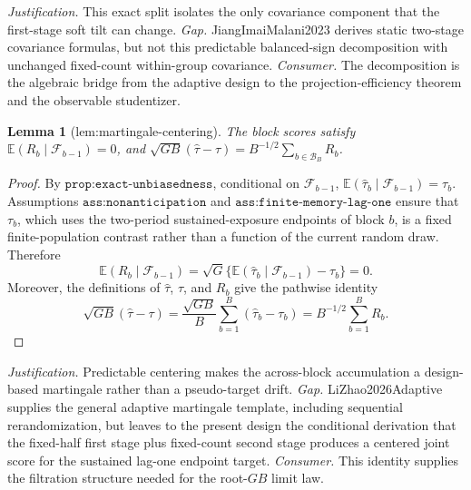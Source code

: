 \documentclass{article}
\newtheorem{lemma}{Lemma}
\begin{document}
\par\smallskip\noindent \textit{Justification.} This exact split isolates the only covariance component that the first-stage soft tilt can change. \textit{Gap.} JiangImaiMalani2023 derives static two-stage covariance formulas, but not this predictable balanced-sign decomposition with unchanged fixed-count within-group covariance. \textit{Consumer.} The decomposition is the algebraic bridge from the adaptive design to the projection-efficiency theorem and the observable studentizer.

\begin{lemma}[lem:martingale-centering]\label{lem:martingale-centering}
The block scores satisfy \(\mathbb E(R_b\mid\mathcal F_{b-1})=0\), and \(\sqrt{GB}(\widehat\tau-\tau)=B^{-1/2}\sum_{b\in\mathcal B_B}R_b\).
\end{lemma}
\begin{proof}
By \(\texttt{prop:exact-unbiasedness}\), conditional on \(\mathcal F_{b-1}\), \(\mathbb E(\widehat\tau_b\mid\mathcal F_{b-1})=\tau_b\).  Assumptions \(\texttt{ass:nonanticipation}\) and \(\texttt{ass:finite-memory-lag-one}\) ensure that \(\tau_b\), which uses the two-period sustained-exposure endpoints of block \(b\), is a fixed finite-population contrast rather than a function of the current random draw.  Therefore
\[
 \mathbb E(R_b\mid\mathcal F_{b-1})
 =\sqrt G\{\mathbb E(\widehat\tau_b\mid\mathcal F_{b-1})-\tau_b\}=0.
\]
Moreover, the definitions of \(\widehat\tau\), \(\tau\), and \(R_b\) give the pathwise identity
\[
 \sqrt{GB}(\widehat\tau-\tau)
 =\frac{\sqrt{GB}}B\sum_{b=1}^B(\widehat\tau_b-\tau_b)
 =B^{-1/2}\sum_{b=1}^BR_b.
\]
\end{proof}
\par\smallskip\noindent \textit{Justification.} Predictable centering makes the across-block accumulation a design-based martingale rather than a pseudo-target drift. \textit{Gap.} LiZhao2026Adaptive supplies the general adaptive martingale template, including sequential rerandomization, but leaves to the present design the conditional derivation that the fixed-half first stage plus fixed-count second stage produces a centered joint score for the sustained lag-one endpoint target. \textit{Consumer.} This identity supplies the filtration structure needed for the root-\(GB\) limit law.
\end{document}
